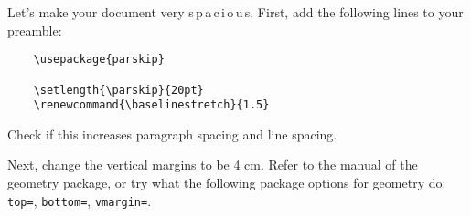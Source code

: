 \documentclass[a4paper]{article}
\begin{document}
\begin{exercise}[spacing]
    Let's make your document very\; s\,p\,a\,c\,i\,o\,u\,s. First, add the following
    lines to your preamble:
    \begin{verbatim}
    \usepackage{parskip}

    \setlength{\parskip}{20pt}
    \renewcommand{\baselinestretch}{1.5} 
    \end{verbatim}

    
    Check if this increases paragraph spacing and line spacing.

    Next, change the vertical margins to be 4 cm. Refer to the manual of the geometry
    package, or try what the following package options for geometry do: \texttt{top=},
    \texttt{bottom=}, \texttt{vmargin=}.
    
\end{exercise}

\end{document}
